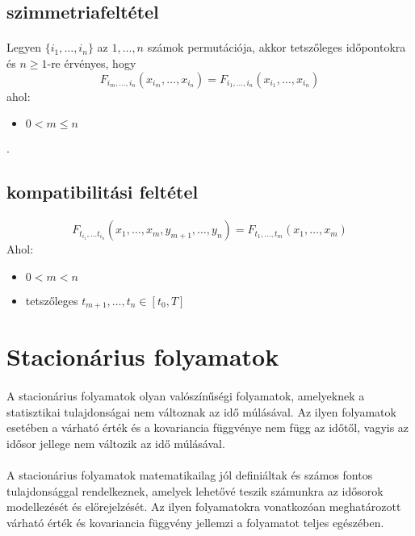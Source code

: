 \documentclass[11pt,a4pape,draftr]{article}
\begin{document}
			\subsection{szimmetriafeltétel}
				\paragraph{}
					Legyen $\{i_1, \dots, i_n\}$ az $1, \dots, n$ számok permutációja, akkor tetszőleges időpontokra és $n \ge 1$-re érvényes, hogy
					$$F_{i_m, \dots, i_n}(x_{i_m}, \dots, x_{i_n}) = F_{i_1, \dots, i_n}(x_{i_1}, \dots, x_{i_n})$$
					ahol:
					\begin{itemize}
						\item $0 < m \le n$ 
					\end{itemize}.
			\subsection{kompatibilitási feltétel}
				\paragraph{}
					$$F_{t_{i_1},\dots t_{i_n}}(x_1, \dots, x_m, y_{m+1}, \dots,y_n) = F_{t_1, \dots,t_m}(x_1, \dots, x_m)$$
					Ahol:
					\begin{itemize}
						\item $0< m < n$
						\item tetszőleges $t_{m+1}, \dots , t_n \in [t_0,T]$
					\end{itemize}
		\section{Stacionárius folyamatok}
			\paragraph{}
				A stacionárius folyamatok olyan valószínűségi folyamatok, amelyeknek a statisztikai tulajdonságai nem változnak az idő múlásával. Az ilyen folyamatok esetében a várható érték és a kovariancia függvénye nem függ az időtől, vagyis az idősor jellege nem változik az idő múlásával.
			\paragraph{}
				A stacionárius folyamatok matematikailag jól definiáltak és számos fontos tulajdonsággal rendelkeznek, amelyek lehetővé teszik számunkra az idősorok modellezését és előrejelzését. Az ilyen folyamatokra vonatkozóan meghatározott várható érték és kovariancia függvény jellemzi a folyamatot teljes egészében. 
\end{document}
